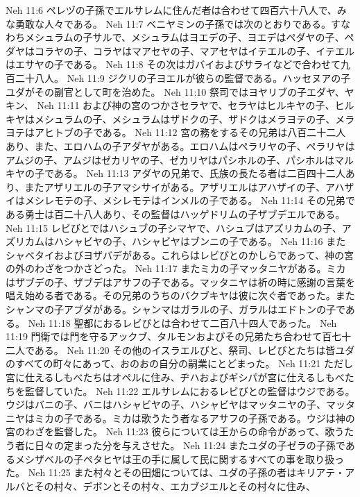 Neh 11:6  ペレヅの子孫でエルサレムに住んだ者は合わせて四百六十八人で、みな勇敢な人々である。
Neh 11:7  ベニヤミンの子孫では次のとおりである。すなわちメシュラムの子サルで、メシュラムはヨエデの子、ヨエデはペダヤの子、ペダヤはコラヤの子、コラヤはマアセヤの子、マアセヤはイテエルの子、イテエルはエサヤの子である。
Neh 11:8  その次はガバイおよびサライなどで合わせて九百二十八人。
Neh 11:9  ジクリの子ヨエルが彼らの監督である。ハッセヌアの子ユダがその副官として町を治めた。
Neh 11:10  祭司ではヨヤリブの子エダヤ、ヤキン、
Neh 11:11  および神の宮のつかさセラヤで、セラヤはヒルキヤの子、ヒルキヤはメシュラムの子、メシュラムはザドクの子、ザドクはメラヨテの子、メラヨテはアヒトブの子である。
Neh 11:12  宮の務をするその兄弟は八百二十二人あり、また、エロハムの子アダヤがある。エロハムはペラリヤの子、ペラリヤはアムジの子、アムジはゼカリヤの子、ゼカリヤはパシホルの子、パシホルはマルキヤの子である。
Neh 11:13  アダヤの兄弟で、氏族の長たる者は二百四十二人あり、またアザリエルの子アマシサイがある。アザリエルはアハザイの子、アハザイはメシレモテの子、メシレモテはインメルの子である。
Neh 11:14  その兄弟である勇士は百二十八人あり、その監督はハッゲドリムの子ザブデエルである。
Neh 11:15  レビびとではハシュブの子シマヤで、ハシュブはアズリカムの子、アズリカムはハシャビヤの子、ハシャビヤはブンニの子である。
Neh 11:16  またシャベタイおよびヨザバデがある。これらはレビびとのかしらであって、神の宮の外のわざをつかさどった。
Neh 11:17  またミカの子マッタニヤがある。ミカはザブデの子、ザブデはアサフの子である。マッタニヤは祈の時に感謝の言葉を唱え始める者である。その兄弟のうちのバクブキヤは彼に次ぐ者であった。またシャンマの子アブダがある。シャンマはガラルの子、ガラルはエドトンの子である。
Neh 11:18  聖都におるレビびとは合わせて二百八十四人であった。
Neh 11:19  門衛では門を守るアックブ、タルモンおよびその兄弟たち合わせて百七十二人である。
Neh 11:20  その他のイスラエルびと、祭司、レビびとたちは皆ユダのすべての町々にあって、おのおの自分の嗣業にとどまった。
Neh 11:21  ただし宮に仕えるしもべたちはオペルに住み、ヂハおよびギシパが宮に仕えるしもべたちを監督していた。
Neh 11:22  エルサレムにおるレビびとの監督はウジである。ウジはバニの子、バニはハシャビヤの子、ハシャビヤはマッタニヤの子、マッタニヤはミカの子である。ミカは歌うたう者なるアサフの子孫である。ウジは神の宮のわざを監督した。
Neh 11:23  彼らについては王からの命令があって、歌うたう者に日々の定まった分を与えさせた。
Neh 11:24  またユダの子ゼラの子孫であるメシザベルの子ペタヒヤは王の手に属して民に関するすべての事を取り扱った。
Neh 11:25  また村々とその田畑については、ユダの子孫の者はキリアテ・アルバとその村々、デボンとその村々、エカブジエルとその村々に住み、
